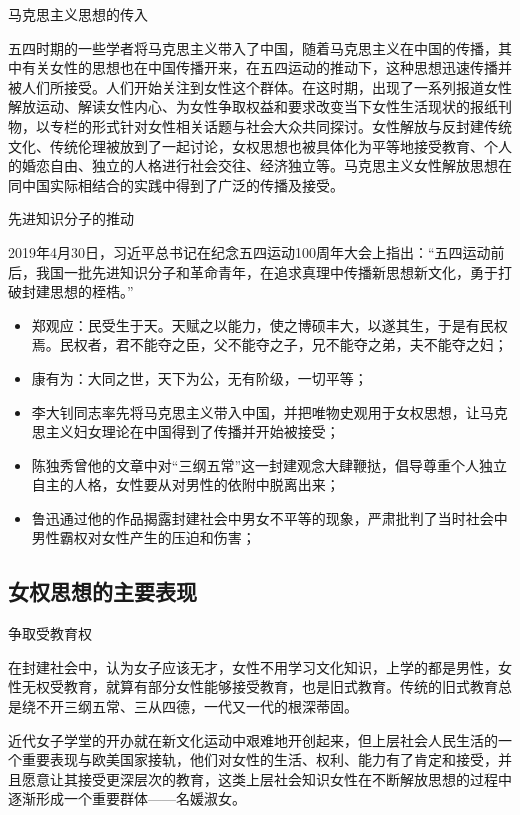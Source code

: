 \begin{frame}{马克思主义思想的传入}
    \begin{block}{}
        五四时期的一些学者将马克思主义带入了中国，随着马克思主义在中国的传播，其中有关女性的思想也在中国传播开来，在五四运动的推动下，这种思想迅速传播并被人们所接受。人们开始关注到女性这个群体。在这时期，出现了一系列报道女性解放运动、解读女性内心、为女性争取权益和要求改变当下女性生活现状的报纸刊物，以专栏的形式针对女性相关话题与社会大众共同探讨。女性解放与反封建传统文化、传统伦理被放到了一起讨论，女权思想也被具体化为平等地接受教育、个人的婚恋自由、独立的人格进行社会交往、经济独立等。马克思主义女性解放思想在同中国实际相结合的实践中得到了广泛的传播及接受。
    \end{block}
\end{frame}

\begin{frame}{先进知识分子的推动}
    \begin{block}{}
        2019年4月30日，习近平总书记在纪念五四运动100周年大会上指出：“五四运动前后，我国一批先进知识分子和革命青年，在追求真理中传播新思想新文化，勇于打破封建思想的桎梏。”
    \end{block}
    \begin{block}{}
        \begin{itemize}
            \item 郑观应：民受生于天。天赋之以能力，使之博硕丰大，以遂其生，于是有民权焉。民权者，君不能夺之臣，父不能夺之子，兄不能夺之弟，夫不能夺之妇；
            \item 康有为：大同之世，天下为公，无有阶级，一切平等；
            \item 李大钊同志率先将马克思主义带入中国，并把唯物史观用于女权思想，让马克思主义妇女理论在中国得到了传播并开始被接受；
            \item 陈独秀曾他的文章中对“三纲五常”这一封建观念大肆鞭挞，倡导尊重个人独立自主的人格，女性要从对男性的依附中脱离出来；
            \item 鲁迅通过他的作品揭露封建社会中男女不平等的现象，严肃批判了当时社会中男性霸权对女性产生的压迫和伤害；
        \end{itemize}
    \end{block}
\end{frame}



\subsection{女权思想的主要表现}
\begin{frame}{争取受教育权}
    \begin{block}{}
        在封建社会中，认为女子应该无才，女性不用学习文化知识，上学的都是男性，女性无权受教育，就算有部分女性能够接受教育，也是旧式教育。传统的旧式教育总是绕不开三纲五常、三从四德，一代又一代的根深蒂固。

        近代女子学堂的开办就在新文化运动中艰难地开创起来，但上层社会人民生活的一个重要表现与欧美国家接轨，他们对女性的生活、权利、能力有了肯定和接受，并且愿意让其接受更深层次的教育，这类上层社会知识女性在不断解放思想的过程中逐渐形成一个重要群体——名媛淑女。
    \end{block}
\end{frame}

